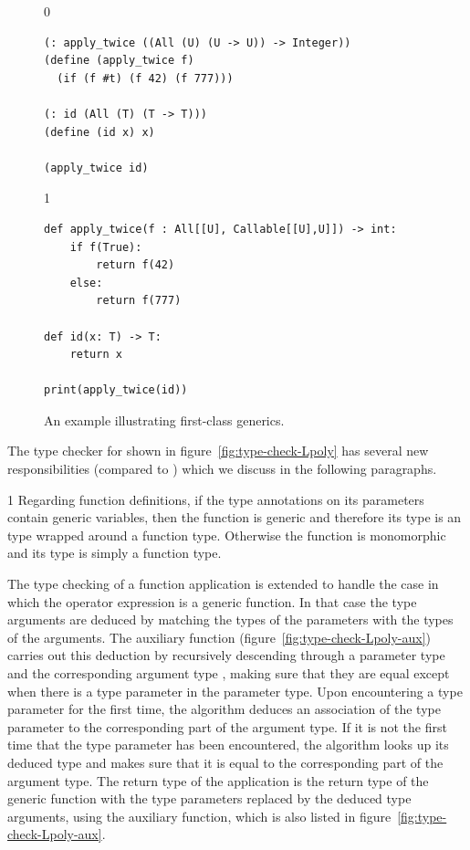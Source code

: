 \documentclass[7x10]{TimesAPriori_MIT}%
\def\racketEd{0}
\def\pythonEd{1}
\def\edition{1}
\newcommand{\pythonColor}[0]{}
\numberwithin{theorem}{chapter}
\numberwithin{definition}{chapter}
\numberwithin{equation}{chapter}
\begin{document}
\begin{figure}[tbp]
\begin{tcolorbox}[colback=white]  
{\if\edition\racketEd
\begin{lstlisting}
(: apply_twice ((All (U) (U -> U)) -> Integer))
(define (apply_twice f)
  (if (f #t) (f 42) (f 777)))

(: id (All (T) (T -> T)))
(define (id x) x)

(apply_twice id)
\end{lstlisting}
\fi}
{\if\edition\pythonEd\pythonColor
\begin{lstlisting}
def apply_twice(f : All[[U], Callable[[U],U]]) -> int:
    if f(True):
        return f(42)
    else:
        return f(777)

def id(x: T) -> T:
    return x

print(apply_twice(id))
\end{lstlisting}
\fi}
\end{tcolorbox}

\caption{An example illustrating first-class generics.}
\label{fig:apply-twice}
\end{figure}


The type checker for \LangPoly{} shown in
figure~\ref{fig:type-check-Lpoly} has several new responsibilities
(compared to \LangLam{}) which we discuss in the following paragraphs.

{\if\edition\pythonEd\pythonColor
%
Regarding function definitions, if the type annotations on its
parameters contain generic variables, then the function is generic and
therefore its type is an  type wrapped around a function
type. Otherwise the function is monomorphic and its type is simply
a function type.
%
\fi}

The type checking of a function application is extended to handle the
case in which the operator expression is a generic function. In that case
the type arguments are deduced by matching the types of the parameters
with the types of the arguments.
%
The  auxiliary function
(figure~\ref{fig:type-check-Lpoly-aux}) carries out this deduction by
recursively descending through a parameter type  and
the corresponding argument type , making sure that they
are equal except when there is a type parameter in the parameter
type. Upon encountering a type parameter for the first time, the
algorithm deduces an association of the type parameter to the
corresponding part of the argument type. If it is not the first time
that the type parameter has been encountered, the algorithm looks up
its deduced type and makes sure that it is equal to the corresponding
part of the argument type.  The return type of the application is the
return type of the generic function with the type parameters
replaced by the deduced type arguments, using the
 auxiliary function, which is also listed in
figure~\ref{fig:type-check-Lpoly-aux}.
\end{document}

